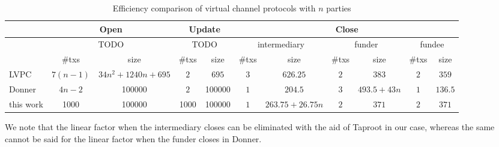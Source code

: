   \begin{table*}
    \caption{Efficiency comparison of virtual channel protocols with $n$
    parties}
    \label{table:comparison:overhead:n-parties}
    \begin{minipage}{\textwidth}
    \begin{center}
    \begin{tabular}{|l|c|c|c|c|c|c|c|c|c|c|}
    \hline
              & \multicolumn{2}{|c|}{Open} & \multicolumn{2}{|c|}{Update} &
              \multicolumn{6}{|c|}{Close} \\
    \hline
              & \multicolumn{2}{|c|}{TODO} & \multicolumn{2}{|c|}{TODO} &
              \multicolumn{2}{|c|}{intermediary} & \multicolumn{2}{|c|}{funder}
              & \multicolumn{2}{|c|}{fundee} \\
    \hline
              & \#txs & size & \#txs & size & \#txs & size & \#txs & size &
              \#txs & size \\
    \hline
    LVPC      & $7(n-1)$ & $34n^2+1240n+695$ & $2$ & $695$ & $3$ &
              $626.25$ & $2$ & $383$ & $2$ & $359$ \\
    \hline
    Donner    & $4n-2$ & 100000 & $2$ & 100000 & $1$ & $204.5$ & $3$ & $493.5 +
    43n$ & $1$ & $136.5$ \\
    \hline
    this work & 1000 & 100000 & 1000 & 100000 & $1$ & $263.75 + 26.75n$ & $2$ &
    $371$ & $2$ & $371$\\
    \hline
    \end{tabular}
    \end{center}
    \end{minipage}
  \end{table*}
  We note that the linear factor when the intermediary closes can be eliminated
  with the aid of Taproot in our case, whereas the same cannot be said for the
  linear factor when the funder closes in Donner.
